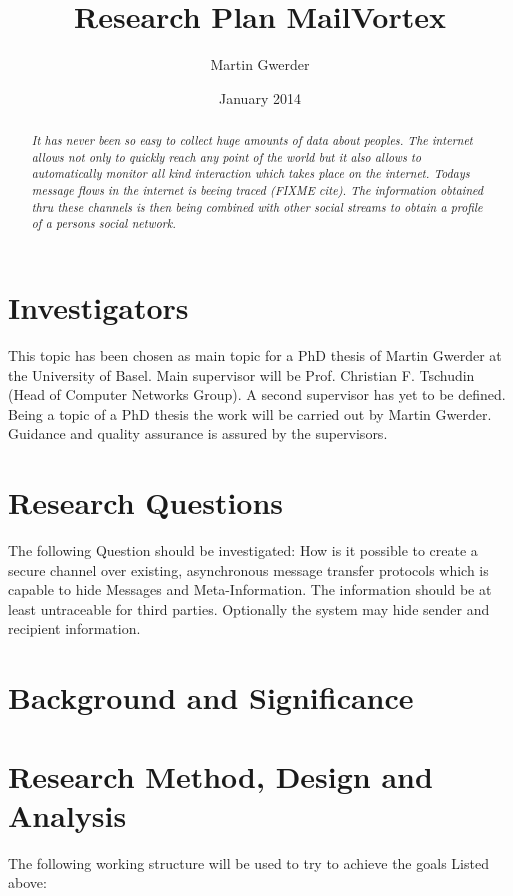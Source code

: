 \documentclass[twocolumn,a4paper]{article}
\begin{document}
\title{Research Plan MailVortex}
\author{Martin Gwerder}
\date{January 2014}
\maketitle

\begin{abstract}\emph{
It has never been so easy  to collect huge amounts of data about peoples. The internet allows not only to quickly reach any point of the world but it also allows to automatically monitor all kind interaction which takes place on the internet. Todays message flows in the internet is beeing traced (FIXME cite). The information obtained thru these channels is then being combined with other social streams to obtain a profile of a persons social network.
}\end{abstract}

\section{Investigators}
This topic has been chosen as main topic for a PhD thesis of Martin Gwerder at the University of Basel. Main supervisor will be Prof. Christian F. Tschudin (Head of Computer Networks Group). A second supervisor has yet to be defined. Being a topic of a PhD thesis the work will be carried out by Martin Gwerder. Guidance and quality assurance is assured by the supervisors.

\section{Research Questions}
The following Question should be investigated: How is it possible to create a secure channel over existing, asynchronous message transfer protocols which is capable to hide Messages and Meta-Information. The information should be at least untraceable for third parties. Optionally the system may hide sender and recipient information.

\section{Background and Significance}

\section{Research Method, Design and Analysis}
The following working structure will be used to try to achieve the goals Listed above:\par
\end{document}
